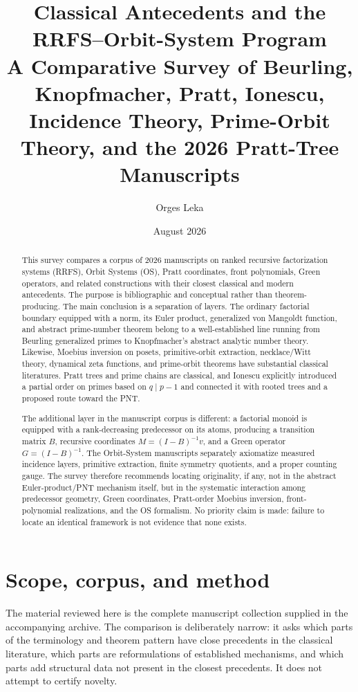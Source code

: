 \documentclass[11pt]{article}
\title{\textbf{Classical Antecedents and the RRFS--Orbit-System Program}\\[0.35em]
\large A Comparative Survey of Beurling, Knopfmacher, Pratt, Ionescu, Incidence Theory, Prime-Orbit Theory, and the 2026 Pratt-Tree Manuscripts}
\author{Orges Leka}
\date{August 2026}
\begin{document}
\maketitle

\begin{abstract}
This survey compares a corpus of 2026 manuscripts on ranked recursive factorization systems (RRFS), Orbit Systems (OS), Pratt coordinates, front polynomials, Green operators, and related constructions with their closest classical and modern antecedents. The purpose is bibliographic and conceptual rather than theorem-producing. The main conclusion is a separation of layers. The ordinary factorial boundary equipped with a norm, its Euler product, generalized von Mangoldt function, and abstract prime-number theorem belong to a well-established line running from Beurling generalized primes to Knopfmacher's abstract analytic number theory. Likewise, Moebius inversion on posets, primitive-orbit extraction, necklace/Witt theory, dynamical zeta functions, and prime-orbit theorems have substantial classical literatures. Pratt trees and prime chains are classical, and Ionescu explicitly introduced a partial order on primes based on $q\mid p-1$ and connected it with rooted trees and a proposed route toward the PNT.

The additional layer in the manuscript corpus is different: a factorial monoid is equipped with a rank-decreasing predecessor on its atoms, producing a transition matrix $B$, recursive coordinates $M=(I-B)^{-1}v$, and a Green operator $G=(I-B)^{-1}$. The Orbit-System manuscripts separately axiomatize measured incidence layers, primitive extraction, finite symmetry quotients, and a proper counting gauge. The survey therefore recommends locating originality, if any, not in the abstract Euler-product/PNT mechanism itself, but in the systematic interaction among predecessor geometry, Green coordinates, Pratt-order Moebius inversion, front-polynomial realizations, and the OS formalism. No priority claim is made: failure to locate an identical framework is not evidence that none exists.
\end{abstract}

\tableofcontents

\section{Scope, corpus, and method}
The material reviewed here is the complete manuscript collection supplied in the accompanying archive. The comparison is deliberately narrow: it asks which parts of the terminology and theorem pattern have close precedents in the classical literature, which parts are reformulations of established mechanisms, and which parts add structural data not present in the closest precedents. It does not attempt to certify novelty.
\end{document}
